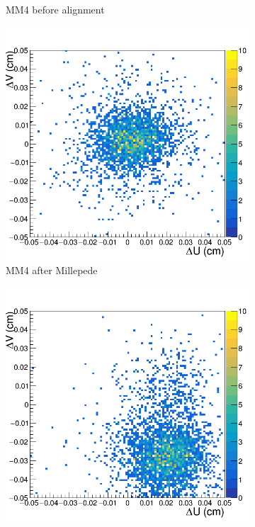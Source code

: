 \begin{figure}[h!]
\begin{subfigure}[l]{.45\textwidth}
   \caption{MM4 before alignment}
   \label{fig:MX4_before}
 \end{subfigure}
 \begin{subfigure}[r]{.45\textwidth}
   \centering
   \includegraphics[width=\linewidth]{thesis_figures/alignment/Run_3211_after_millepede/square/MX4.png}
   \caption{MM4 after Millepede}
   \label{fig:MX4_after}
 \end{subfigure}
 \hfill
 \begin{subfigure}[l]{.45\textwidth}
   \centering
   \includegraphics[width=\linewidth]{thesis_figures/alignment/Run_3211_before/square/MX5.png}

\end{subfigure}
\end{figure}
